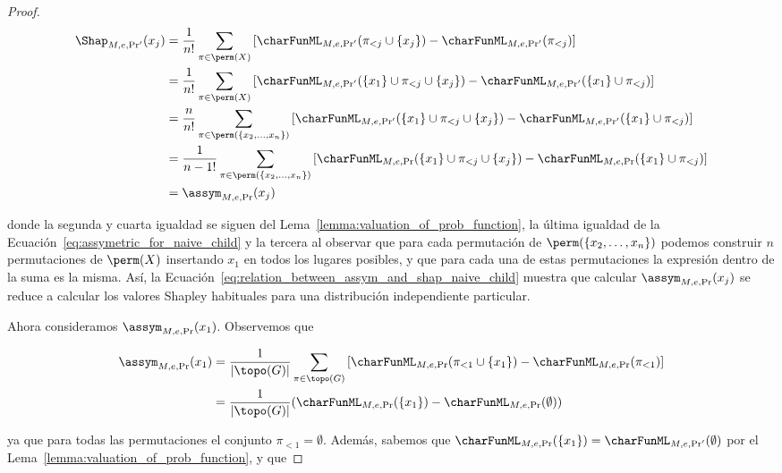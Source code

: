 \begin{proof}
    \begin{align*}
        \Shap_{M,e,\Pr'}(x_j) &= \frac{1}{n!} \sum_{\pi \in \perm(X)} \left[ \charFunML_{M,e,\Pr'}(\pi_{<j} \cup \{x_j\}) - \charFunML_{M,e,\Pr'}(\pi_{<j}) \right]\\
        &= \frac{1}{n!} \sum_{\pi \in \perm(X)} \left[ \charFunML_{M,e,\Pr'}(\{x_1\} \cup \pi_{<j} \cup \{x_j\}) - \charFunML_{M,e,\Pr'}(\{x_1\} \cup \pi_{<j}) \right]\\
        &= \frac{n}{n!} \sum_{\pi \in \perm(\{x_2,\ldots,x_n\})} \left[ \charFunML_{M,e,\Pr'}(\{x_1\} \cup \pi_{<j} \cup \{x_j\}) - \charFunML_{M,e,\Pr'}(\{x_1\} \cup \pi_{<j}) \right] \\
        &= \frac{1}{n-1!} \sum_{\pi \in \perm(\{x_2,\ldots,x_n\})} \left[ \charFunML_{M,e,\Pr}(\{x_1\} \cup \pi_{<j} \cup \{x_j\}) - \charFunML_{M,e,\Pr}(\{x_1\} \cup \pi_{<j}) \right]\\
        &= \assym_{M,e,\Pr}(x_j)
    \end{align*}
    
    donde la segunda y cuarta igualdad se siguen del Lema~\ref{lemma:valuation_of_prob_function}, la última igualdad de la Ecuación~\ref{eq:assymetric_for_naive_child} y la tercera al observar que para cada permutación de $\perm(\{x_2,\ldots,x_n\})$ podemos construir $n$ permutaciones de $\perm(X)$ insertando $x_1$ en todos los lugares posibles, y que para cada una de estas permutaciones la expresión dentro de la suma es la misma. Así, la Ecuación~\ref{eq:relation_between_assym_and_shap_naive_child} muestra que calcular $\assym_{M,e,\Pr}(x_j)$ se reduce a calcular los valores Shapley habituales para una distribución independiente particular.
    
    Ahora consideramos $\assym_{M,e,\Pr}(x_1)$. Observemos que
    
    \begin{align*}
        \assym_{M,e,\Pr}(x_1) &= \frac{1}{|\topo(G)|} \sum_{\pi \in \topo(G)} \left[ \charFunML_{M,e,\Pr}(\pi_{<1} \cup \{x_1\}) - \charFunML_{M,e,\Pr}(\pi_{<1}) \right]\\
        &= \frac{1}{|\topo(G)|}( \charFunML_{M,e,\Pr}(\{x_1\}) - \charFunML_{M,e,\Pr}(\emptyset))
    \end{align*}

    
    ya que para todas las permutaciones el conjunto $\pi_{<1} = \emptyset$. Además, sabemos que $\charFunML_{M,e,\Pr}(\{x_1\}) = \charFunML_{M,e,\Pr'}(\emptyset)$ por el Lema~\ref{lemma:valuation_of_prob_function}, y que
    

\end{proof}
